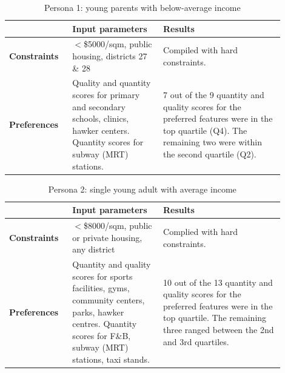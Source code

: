 \documentclass[a4paper, 11pt]{article}
\begin{document}
\begin{table}[ht]
    \centering
    \begin{tabular}{p{0.2\linewidth} | p{0.3\linewidth} | p{0.4\linewidth}} \hline
      & \textbf{Input parameters}  & \textbf{Results} \\ \hline
      \textbf{Constraints}& $<$\$5000/sqm, public housing, districts 27 \& 28
  & Compiled with hard constraints. \\ \hline
\textbf{Preferences} & Quality and quantity scores for primary and secondary schools, clinics, hawker centers. Quantity scores for subway (MRT) stations. & 7 out of the 9 quantity and quality scores for the preferred features were in the top quartile (Q4). The remaining two were within the second quartile (Q2). \\\hline
    \end{tabular}
    \caption{Persona 1: young parents with below-average income}
    \label{tab:my_label}
\end{table}

\begin{table}[ht]
    \centering
    \begin{tabular}{p{0.2\linewidth} | p{0.3\linewidth} | p{0.4\linewidth}} \hline
      & \textbf{Input parameters}  & \textbf{Results} \\ \hline
      \textbf{Constraints}& $<$\$8000/sqm, public or private housing, any district & Complied with hard constraints. \\ \hline
\textbf{Preferences} & 
Quantity and quality scores for sports facilities, gyms, community centers, parks, hawker centres. Quantity scores for F\&B, subway (MRT) stations, taxi stands. & 
10 out of the 13 quantity and quality scores for the preferred features were in the top quartile. The remaining three ranged between the 2nd and 3rd quartiles.

 \\\hline
    \end{tabular}
    \caption{Persona 2: single young adult with average income}
    \label{tab:my_label}
\end{table}
\end{document}
